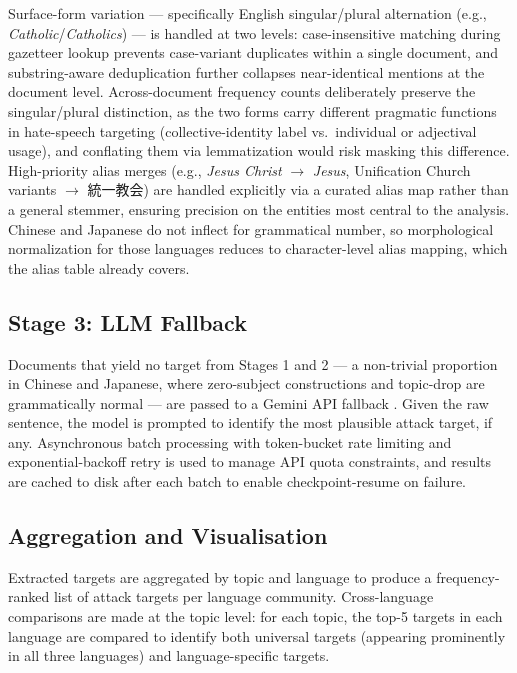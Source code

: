 \documentclass[../CLthesis.tex]{subfiles}
\begin{document}
Surface-form variation — specifically English singular/plural alternation (e.g., \textit{Catho\allowbreak lic}/\textit{Catholics}) — is handled at two levels: case-insensitive matching during gazetteer lookup prevents case-variant duplicates within a single document, and substring-aware deduplication further collapses near-identical mentions at the document level. Across-document frequency counts deliberately preserve the singular/plural distinction, as the two forms carry different pragmatic functions in hate-speech targeting (collective-identity label vs.\ individual or adjectival usage), and conflating them via lemmatization would risk masking this difference. High-priority alias merges (e.g., \textit{Jesus Christ} $\rightarrow$ \textit{Jesus}, Unification Church variants $\rightarrow$ 統一教会) are handled explicitly via a curated alias map rather than a general stemmer, ensuring precision on the entities most central to the analysis. Chinese and Japanese do not inflect for grammatical number, so morphological normalization for those languages reduces to character-level alias mapping, which the alias table already covers.

\subsection{Stage 3: LLM Fallback}

Documents that yield no target from Stages 1 and 2 — a non-trivial proportion in Chinese and Japanese, where zero-subject constructions and topic-drop are grammatically normal — are passed to a Gemini API fallback \citep{geminiteam2025geminifamilyhighlycapable}. Given the raw sentence, the model is prompted to identify the most plausible attack target, if any. Asynchronous batch processing with token-bucket rate limiting and exponential-backoff retry is used to manage API quota constraints, and results are cached to disk after each batch to enable checkpoint-resume on failure.

\subsection{Aggregation and Visualisation}

Extracted targets are aggregated by topic and language to produce a frequency-ranked list of attack targets per language community. Cross-language comparisons are made at the topic level: for each topic, the top-5 targets in each language are compared to identify both universal targets (appearing prominently in all three languages) and language-specific targets.
\end{document}
